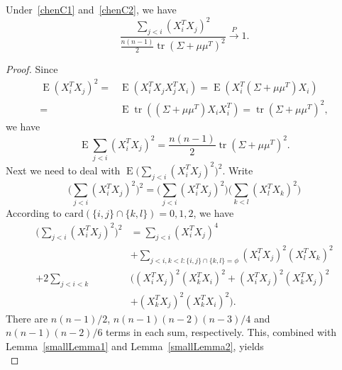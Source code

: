 \documentclass[smallcondensed,final,natbib]{svjour3}          %
\DeclareMathOperator{\mytr}{tr}
\DeclareMathOperator{\myE}{E}
\begin{document}
\begin{lemma}\label{ratioLemma}
    Under~\eqref{chenC1} and~\eqref{chenC2}, we have
        \begin{equation*}
        \frac{\sum_{j<i}{(X_i^T X_j)}^2}{\frac{n(n-1)}{2}\mytr  (\Sigma+\mu\mu^T)^2}
        \xrightarrow{P}1.
        \end{equation*}
\end{lemma}
\begin{proof}
    Since
        \begin{equation*}
        \begin{aligned}
            \myE(X_i^T X_j)^2=&
            \myE(X_i^T X_j X_j^T X_i)=
            \myE(X_i^T (\Sigma+\mu \mu^T) X_i)\\
            =&
            \myE\mytr ((\Sigma+\mu \mu^T) X_i X_i^T)=\mytr {(\Sigma+\mu \mu^T)}^2,
        \end{aligned}
        \end{equation*}
   we have 
        \begin{equation*}
        \myE\sum_{j<i}(X_i^T X_j)^2=\frac{n(n-1)}{2}\mytr {(\Sigma+\mu\mu^T)}^2.
        \end{equation*}
    Next we need to deal with $\myE \big(\sum_{j<i}{(X_i^T X_j)}^2\big)^2$.
    Write 
    \begin{equation*}
    \big(\sum_{j<i}{(X_i^T X_j)}^2\big)^2=
    \big(\sum_{j<i}{(X_i^T X_j)}^2\big)
    \big(\sum_{k<l}{(X_l^T X_k)}^2\big)
    \end{equation*}
    According to $\mathrm{card}(\{i,j\}\cap\{k,l\})=0,1,2$, we have
    \begin{equation*}%
    \begin{aligned}
        \big(\sum_{j<i}{(X_i^T X_j)}^2\big)^2
        &=
        \sum_{j<i}{(X_i^T X_j)}^4\\
        & +
        \sum_{j<i,k<l:\{i,j\}\cap \{k,l\}=\phi}{(X_i^T X_j)}^2{(X_l^T X_k)}^2\\
        +2\sum_{j<i<k}&\Big(
        {(X_i^T X_j)}^2{(X_k^T X_i)}^2+
{(X_i^T X_j)}^2{(X_k^T X_j)}^2\\
        &+
{(X_k^T X_j)}^2{(X_k^T X_i)}^2
        \Big).
    \end{aligned}
    \end{equation*}
    There are $n(n-1)/2$, $n(n-1)(n-2)(n-3)/4$ and $n(n-1)(n-2)/6$ terms in each sum, respectively.
    This, combined with Lemma~\ref{smallLemma1} and Lemma~\ref{smallLemma2}, yields
    \begin{equation*}

\end{equation*}
\end{proof}
\end{document}
